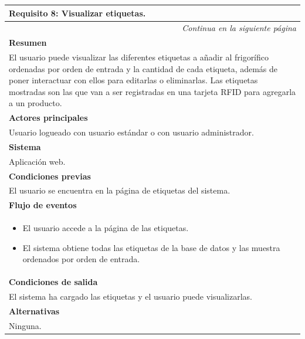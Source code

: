 \begin{longtable}{|p{}|}
\hline
 \rowcolor[gray]{.5}
 \color{white}\textbf{Requisito 8: Visualizar etiquetas.} \\
\hline
\endfirsthead
\endhead
\hline \multicolumn{1}{r}{\textit{Continua en la siguiente página}} \\
\endfoot
\endlastfoot
     \rowcolor[gray]{.9}
     \textbf{Resumen} \\
     \hline
     El usuario puede visualizar las diferentes etiquetas a añadir al frigorífico ordenadas por orden de entrada y la cantidad de cada etiqueta, además de poner interactuar con ellos para editarlas o eliminarlas. Las etiquetas mostradas son las que van a ser registradas en una tarjeta RFID para agregarla a un producto. \\
     \hline
     \rowcolor[gray]{.9}
     \textbf{Actores principales} \\
     \hline
     Usuario logueado con usuario estándar o con usuario administrador. \\
     \hline
     \rowcolor[gray]{.9}
     \textbf{Sistema} \\
     \hline
     Aplicación web. \\
     \hline
     \rowcolor[gray]{.9}
     \textbf{Condiciones previas} \\
     \hline
     El usuario se encuentra en la página de etiquetas del sistema. \\
     \hline
     \rowcolor[gray]{.9}
     \textbf{Flujo de eventos}  \\
     \hline
      \begin{itemize}
         \item El usuario accede a la página de las etiquetas.
         \item El sistema obtiene todas las etiquetas de la base de datos y las muestra ordenados por orden de entrada.
     \end{itemize} \\
     \hline
     \rowcolor[gray]{.9}
     \textbf{Condiciones de salida} \\
     \hline
     El sistema ha cargado las etiquetas y el usuario puede visualizarlas. \\
     \hline
     \rowcolor[gray]{.9}
     \textbf{Alternativas}  \\
     \hline
      Ninguna.\\
     \hline
\end{longtable}

